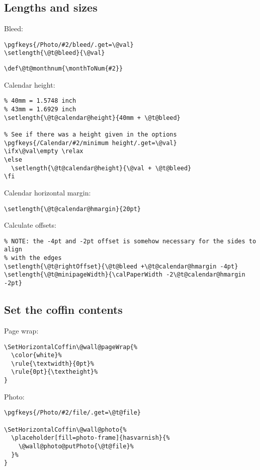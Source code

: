 \documentclass[11pt,oneside]{memoir-article}
\begin{document}
\subsection{Lengths and sizes}
\label{sec:org52e2afd}

Bleed:

\begin{verbatim}
\pgfkeys{/Photo/#2/bleed/.get=\@val}
\setlength{\@t@bleed}{\@val}
\end{verbatim}

\begin{verbatim}
\def\@t@monthnum{\monthToNum{#2}}
\end{verbatim}

Calendar height:

\begin{verbatim}
% 40mm = 1.5748 inch
% 43mm = 1.6929 inch
\setlength{\@t@calendar@height}{40mm + \@t@bleed}

% See if there was a height given in the options
\pgfkeys{/Calendar/#2/minimum height/.get=\@val}
\ifx\@val\empty \relax
\else
  \setlength{\@t@calendar@height}{\@val + \@t@bleed}
\fi
\end{verbatim}

Calendar horizontal margin:

\begin{verbatim}
\setlength{\@t@calendar@hmargin}{20pt}
\end{verbatim}

Calculate offsets:

\begin{verbatim}
% NOTE: the -4pt and -2pt offset is somehow necessary for the sides to align
% with the edges
\setlength{\@t@rightOffset}{\@t@bleed +\@t@calendar@hmargin -4pt}
\setlength{\@t@minipageWidth}{\calPaperWidth -2\@t@calendar@hmargin -2pt}
\end{verbatim}

\subsection{Set the coffin contents}
\label{sec:org1a530b7}

Page wrap:

\begin{verbatim}
\SetHorizontalCoffin\@wall@pageWrap{%
  \color{white}%
  \rule{\textwidth}{0pt}%
  \rule{0pt}{\textheight}%
}
\end{verbatim}

Photo:

\begin{verbatim}
\pgfkeys{/Photo/#2/file/.get=\@t@file}

\SetHorizontalCoffin\@wall@photo{%
  \placeholder[fill=photo-frame]{hasvarnish}{%
    \@wall@photo@putPhoto{\@t@file}%
  }%
}
\end{verbatim}
\end{document}
